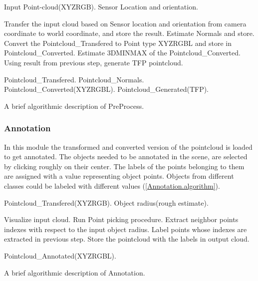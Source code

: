 \begin{algorithm}[t]
\begin{algorithmic}[1]
\REQUIRE Input Point-cloud(XYZRGB).
\REQUIRE Sensor Location and orientation.
\medskip

\STATE Transfer the input cloud based on Sensor location and orientation from camera coordinate to world coordinate, and store the 
result.
\STATE Estimate Normals and store.
\STATE Convert the Pointcloud\_Transfered to Point type XYZRGBL and store in Pointcloud\_Converted.
\STATE Estimate 3DMINMAX of the Pointcloud\_Converted.
\STATE Using result from previous step, generate TFP pointcloud.

\medskip
\ENSURE Pointcloud\_Transfered.
\ENSURE Pointcloud\_Normals.
\ENSURE Pointcloud\_Converted(XYZRGBL).
\ENSURE Pointcloud\_Generated(TFP).

\end{algorithmic}
\caption[PreProcess.]
{A brief algorithmic description of PreProcess.}
\label{Preprocess.algorithm}
\end{algorithm}



 
 
\subsubsection{Annotation}
\label{Annotation.ssec}
In this module the transformed and converted version of the pointcloud is loaded to get annotated. 
The objects needed to be annotated in the scene, are selected by clicking roughly on their center. 
The labels of the points belonging to them are assigned with a value representing object points. 
Objects from different classes could be labeled with different values (\ref{Annotation.algorithm}).

\begin{algorithm}[t]
\begin{algorithmic}[1]
\REQUIRE Pointcloud\_Transfered(XYZRGB).
\REQUIRE Object radius(rough estimate).
\medskip

\STATE Visualize input cloud.
  \STATE Run Point picking procedure.
  \STATE Extract neighbor points indexes with respect to the input object radius.
  \STATE Label points whose indexes are extracted in previous step.
\ENDFOR
\STATE Store the pointcloud with the labels in output cloud.

\medskip
\ENSURE Pointcloud\_Annotated(XYZRGBL).
\end{algorithmic}
\caption[Annotation.]
{A brief algorithmic description of Annotation.}
\label{Annotation.algorithm}
\end{algorithm}


